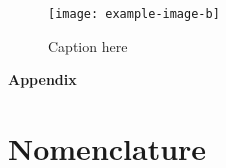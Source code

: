 \documentclass{goose-article}
\begin{document}
\lipsum[7-12]

\begin{figure}[htp]
    \centering
    \texttt{[image: example-image-b]}
    \caption{Caption here}
    \label{fig:b}
\end{figure}




\onecolumn
\justify
\appendix

\begin{center}
    \Large\textbf{Appendix}
\end{center}

\section{Nomenclature}

\lipsum[11-15]
\end{document}
